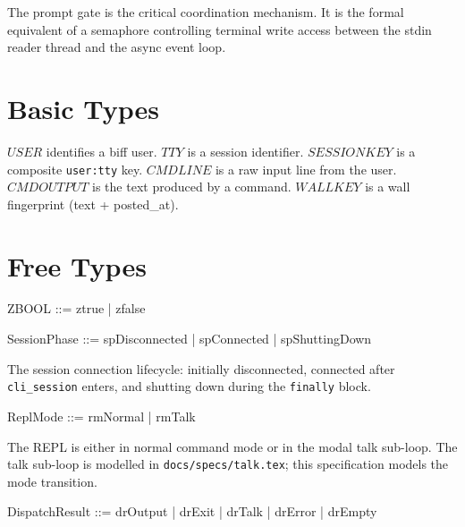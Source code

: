 \documentclass[a4paper,10pt,fleqn]{article}
\begin{document}
The prompt gate is the critical coordination mechanism.  It is the
formal equivalent of a semaphore controlling terminal write access
between the stdin reader thread and the async event loop.

\section{Basic Types}

\begin{zed}
\end{zed}

$USER$ identifies a biff user.  $TTY$ is a session identifier.
$SESSIONKEY$ is a composite \texttt{user:tty} key.  $CMDLINE$ is
a raw input line from the user.  $CMDOUTPUT$ is the text produced
by a command.  $WALLKEY$ is a wall fingerprint (text + posted\_at).

\section{Free Types}

\begin{zed}
  ZBOOL ::= ztrue | zfalse
\end{zed}

\begin{zed}
  SessionPhase ::= spDisconnected | spConnected | spShuttingDown
\end{zed}

The session connection lifecycle: initially disconnected, connected
after \texttt{cli\_session} enters, and shutting down during the
\texttt{finally} block.

\begin{zed}
  ReplMode ::= rmNormal | rmTalk
\end{zed}

The REPL is either in normal command mode or in the modal talk
sub-loop.  The talk sub-loop is modelled in \texttt{docs/specs/talk.tex};
this specification models the mode transition.

\begin{zed}
  DispatchResult ::= drOutput | drExit | drTalk | drError | drEmpty
\end{zed}
\end{document}
